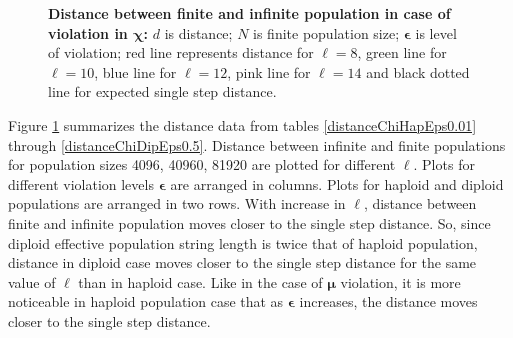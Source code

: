 

\begin{figure}[!ht]
\begin{center}
\hspace{-3em}%
\caption[\textbf{Distance between finite and infinite population in case of violation in $\bm{\chi}$}]{\textbf{Distance between finite and infinite population in case of violation in $\bm{\chi}$:}  
  $d$ is distance; $N$ is finite population size; $\bm{\epsilon}$ is level of violation; 
  red line represents distance for $\ell = 8$, green line for $\ell = 10$, blue line for $\ell = 12$, pink line for $\ell = 14$ 
  and black dotted line for expected single step distance.}
\label{vio_chi_dist}
\end{center}
\end{figure}

Figure \ref{vio_chi_dist} summarizes the distance data from tables \ref{distanceChiHapEps0.01} through 
\ref{distanceChiDipEps0.5}. Distance between infinite and finite populations 
for population sizes {4096, 40960, 81920} are plotted for different $\ell$. 
Plots for different violation levels $\bm{\epsilon}$ are arranged in columns. 
Plots for haploid and diploid populations are arranged in two rows. With increase in $\ell$, 
distance between finite and infinite population moves closer to the single step distance. So, since diploid effective population 
string length is twice that of haploid population, 
distance in diploid case moves closer to the single step distance for the same value of $\ell$ than in haploid case. 
Like in the case of $\bm{\mu}$ violation, it is more noticeable in haploid population case that as $\bm{\epsilon}$ increases, 
the distance moves closer to the single step distance.

